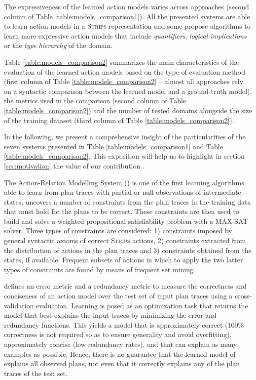 The expressiveness of the learned action models varies across approaches (second column of Table \ref{table:models_comparison1}). All the presented systems are able to learn action models in a \textsc{Strips}  representation \cite{fikes1971strips} and some propose algorithms to learn more expressive action models that include {\em quantifiers}, {\em logical implications} or the {\em type hierarchy} of the domain.

Table \ref{table:models_comparison2} summarizes the main characteristics of the evaluation of the learned action models based on the type of evaluation method (first column of Table \ref{table:models_comparison2} -- almost all approaches rely on a syntactic comparison between the learned model and a ground-truth model), the metrics used in the comparison (second column of Table \ref{table:models_comparison2}) and the number of tested domains alongside the size of the training dataset (third column of Table \ref{table:models_comparison2}).

In the following, we present a comprehensive insight of the particularities of the seven systems presented in Table \ref{table:models_comparison1} and Table \ref{table:models_comparison2}. This exposition will help us to highlight in section \ref{sec:motivation} the value of our contribution \FAMA.


\vspace{0.3cm}

The Action-Relation Modelling System (\textbf{\ARMS}) \cite{yang2007learning} is one of the first learning algorithms able to learn from plan traces with partial or null observations of intermediate states. \ARMS uncovers a number of constraints from the plan traces in the training data that must hold for the plans to be correct. These constraints are then used to build and solve a weighted propositional satisfiability problem with a MAX-SAT solver. Three types of constraints are considered: 1) constraints imposed by general syntactic axioms of correct \textsc{Strips} actions, 2) constraints extracted from the distribution of actions in the plan traces and 3) constraints obtained from the \PO states, if available. Frequent subsets of actions in which to apply the two latter types of constraints are found by means of frequent set mining.

\ARMS defines an error metric and a redundancy metric to measure the correctness and conciseness of an action model over the test set of input plan traces using a cross-validation evaluation. Learning is posed as an optimization task that returns the model that best explains the input traces by minimizing the error and redundancy functions. This yields a model that is approximately correct (100\% correctness is not required so as to ensure generality and avoid overfitting), approximately concise (low redundancy rates), and that can explain as many examples as possible. Hence, there is no guarantee that the learned model of \ARMS explains all observed plans, not even that it correctly explains any of the plan traces of the test set.

